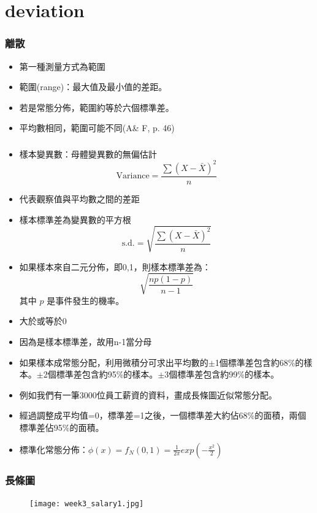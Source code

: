 \documentclass{beamer}
\begin{document}
\section{deviation}
\begin{frame}\frametitle{離散}
\begin{itemize}
\item 第一種測量方式為範圍
\item 範圍(range)：最大值及最小值的差距。
\item 若是常態分佈，範圍約等於六個標準差。
\item 平均數相同，範圍可能不同(A\& F, p. 46)

\end{itemize}
\end{frame}
\begin{frame}\frametitle{}
\begin{itemize}
\item 樣本變異數：母體變異數的無偏估計
\begin{equation}
\textrm{Variance}=\frac{\sum (X-\bar{X})^2}{n}
\end{equation}
\item 代表觀察值與平均數之間的差距
\item 樣本標準差為變異數的平方根
\begin{equation}
\textrm{s.d.}=\sqrt{\frac{\sum (X-\bar{X})^2}{n}}
\end{equation}
\item 如果樣本來自二元分佈，即0,1，則樣本標準差為：\\
\[\sqrt{\frac{np(1-p)}{n-1}}\]
其中 $p$ 是事件發生的機率。
\end{itemize}
\end{frame}
\begin{frame}
\begin{itemize}\frametitle{標準差}
\item 大於或等於0
\item 因為是樣本標準差，故用n-1當分母
\item 如果樣本成常態分配，利用微積分可求出平均數的$\pm$1個標準差包含約68\%的樣本。$\pm$2個標準差包含約95\%的樣本。$\pm$3個標準差包含約99\%的樣本。
\item 例如我們有一筆3000位員工薪資的資料，畫成長條圖近似常態分配。
\item 經過調整成平均值=0，標準差=1之後，一個標準差大約佔68\%的面積，兩個標準差佔95\%的面積。
\item 標準化常態分佈：$\phi(x)=f_{N}(0,1)=\frac{1}{2\pi}exp(-\frac{x^2}{2})$
\end{itemize}
\end{frame}
\begin{frame}\frametitle{長條圖}
\begin{figure}
\begin{center}
\texttt{[image: week3\_salary1.jpg]}
\end{center}
\end{figure}
\end{frame}
\end{document}
